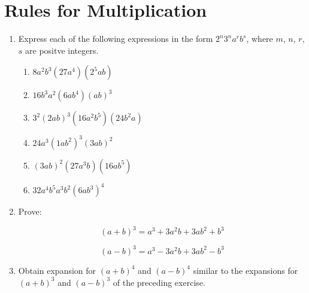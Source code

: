 \documentclass{report}
\def\MLine#1{\par\hspace*{-\leftmargin}\parbox{\textwidth}{\[#1\]}}
\begin{document}
\section{Rules for Multiplication}

\begin{enumerate}
	\item Express each of the following expressions in the form $2^n3^na^rb^s$, where $m$, $n$, $r$, $s$ are positve integers.
		\begin{enumerate}
			\item $8a^2b^3(27a^4)(2^5ab)$
			\item $16b^3a^2(6ab^4)(ab)^3$
			\item $3^2(2ab)^3(16a^2b^5)(24b^2a)$
			\item $24a^3(1ab^2)^3(3ab)^2$
			\item $(3ab)^2(27a^3b)(16ab^5)$
			\item $32a^4b^5a^3b^2(6ab^3)^4$
		\end{enumerate}
	\item Prove:
		\MLine{(a + b)^3 = a^3 + 3a^2b + 3ab^2 + b^3}
		\MLine{(a - b)^3 = a^3 - 3a^2b + 3ab^2 - b^3}
	\item Obtain expansion for $(a + b)^4$ and $(a - b)^4$ similar to the expansions for $(a + b)^3$ and $(a - b)^3$ of the preceding exercise.
\end{enumerate}
\end{document}
